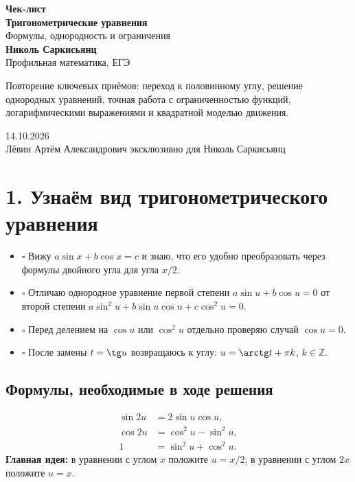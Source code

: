 \documentclass[a4paper,12pt]{article}
\newcommand{\key}[1]{\textcolor{darkaccent}{\textbf{#1}}}
\begin{document}
\thispagestyle{empty}
\begin{center}
\vspace*{19mm}
{\Large\color{darkaccent}\textbf{Чек-лист}}\\[6mm]
{\huge\bfseries Тригонометрические уравнения}\\[3mm]
{\Large Формулы, однородность и ограничения}\\[13mm]
{\large\bfseries Николь Саркисьянц}\\[3mm]
{\normalsize Профильная математика, ЕГЭ}\\[14mm]
\begin{minipage}{0.81\linewidth}
\centering\color{textgray}
Повторение ключевых приёмов: переход к половинному углу,
решение однородных уравнений, точная работа с ограниченностью
функций, логарифмическими выражениями и квадратной моделью движения.
\end{minipage}
\vfill
{\large 14.10.2026}\\[8mm]
{\small Лёвин Артём Александрович эксклюзивно для Николь Саркисьянц}
\vspace{10mm}
\end{center}
\clearpage

\section*{1. Узнаём вид тригонометрического уравнения}
\begin{itemize}
\item $\square$ Вижу $a\sin x+b\cos x=c$ и знаю, что его удобно преобразовать через формулы двойного угла для угла $x/2$.
\item $\square$ Отличаю однородное уравнение первой степени $a\sin u+b\cos u=0$ от второй степени $a\sin^2u+b\sin u\cos u+c\cos^2u=0$.
\item $\square$ Перед делением на $\cos u$ или $\cos^2u$ отдельно проверяю случай $\cos u=0$.
\item $\square$ После замены $t=\tg u$ возвращаюсь к углу: $u=\arctg t+\pi k$, $k\in\mathbb Z$.
\end{itemize}

\subsection*{Формулы, необходимые в ходе решения}
\[
\begin{aligned}
\sin 2u&=2\sin u\cos u,\\
\cos 2u&=\cos^2u-\sin^2u,\\
1&=\sin^2u+\cos^2u.
\end{aligned}
\]
\key{Главная идея:} в уравнении с углом $x$ положите $u=x/2$; в уравнении с углом $2x$ положите $u=x$.
\end{document}
